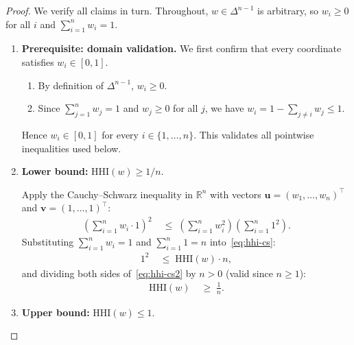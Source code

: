 \documentclass[12pt,openany]{book}
\newcommand{\bfw}{\mathbf{w}}
\numberwithin{equation}{chapter}
\theoremstyle{plain}
\theoremstyle{definition}
\theoremstyle{remark}
\def\bfw{w}%
\begin{document}
\begin{proof}
We verify all claims in turn.  Throughout, $\bfw \in \Delta^{n-1}$
is arbitrary, so $w_i \geq 0$ for all $i$ and
$\sum_{i=1}^{n} w_i = 1$.

\begin{enumerate}

  \item \textbf{Prerequisite: domain validation.}
        We first confirm that every coordinate satisfies
        $w_i \in [0,1]$.
        \begin{enumerate}
          \item By definition of $\Delta^{n-1}$, $w_i \geq 0$.
          \item Since $\sum_{j=1}^{n} w_j = 1$ and $w_j \geq 0$
                for all $j$, we have
                $w_i = 1 - \sum_{j \neq i} w_j \leq 1$.
        \end{enumerate}
        Hence $w_i \in [0,1]$ for every $i \in \{1,\ldots,n\}$.
        This validates all pointwise inequalities used below.

  \item \textbf{Lower bound:}
        $\mathrm{HHI}(\bfw) \geq 1/n$.

        Apply the Cauchy--Schwarz inequality in $\mathbb{R}^n$
        with vectors $\mathbf{u} = (w_1,\ldots,w_n)^\top$ and
        $\mathbf{v} = (1,\ldots,1)^\top$:
        \begin{align}
          \left(\sum_{i=1}^{n} w_i \cdot 1\right)^2
          &\;\leq\;
          \left(\sum_{i=1}^{n} w_i^2\right)
          \left(\sum_{i=1}^{n} 1^2\right).
          \label{eq:hhi-cs}
        \end{align}
        Substituting $\sum_{i=1}^{n} w_i = 1$ and
        $\sum_{i=1}^{n} 1 = n$ into~\eqref{eq:hhi-cs}:
        \begin{align}
          1^2
          &\;\leq\;
          \mathrm{HHI}(\bfw) \cdot n,
          \label{eq:hhi-cs2}
        \end{align}
        and dividing both sides of~\eqref{eq:hhi-cs2} by $n > 0$
        (valid since $n \geq 1$):
        \begin{align}
          \mathrm{HHI}(\bfw)
          &\;\geq\;
          \frac{1}{n}.
          \label{eq:hhi-lb}
        \end{align}

  \item \textbf{Upper bound:}
        $\mathrm{HHI}(\bfw) \leq 1$.


\end{enumerate}
\end{proof}
\end{document}
